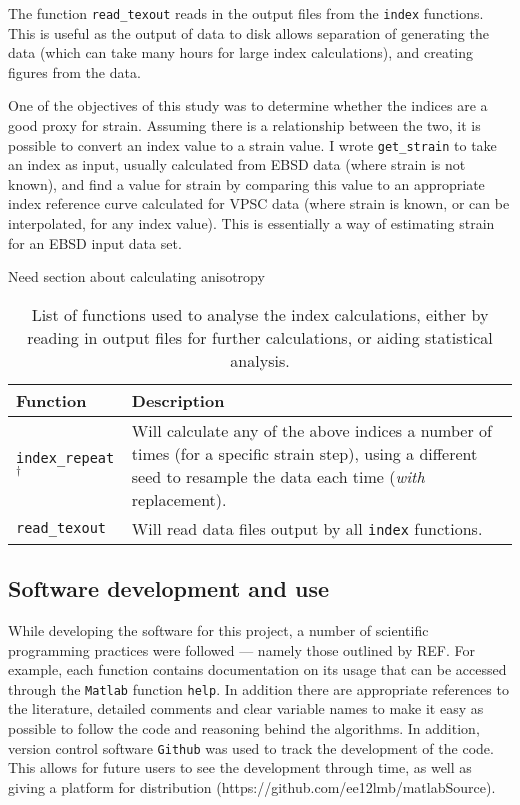 \documentclass[a4paper,12pt]{report}
\numberwithin{equation}{chapter}
\begin{document}
The function \texttt{read\_{}texout} reads in the output files from the \texttt{index} functions. This is useful as the output of data to disk allows separation of generating the data (which can take many hours for large index calculations), and creating figures from the data.

One of the objectives of this study was to determine whether the indices are a good proxy for strain. Assuming there is a relationship between the two, it is possible to convert an index value to a strain value. I wrote \texttt{get\_{}strain} to take an index as input, usually calculated from EBSD data (where strain is not known), and find a value for strain by comparing this value to an appropriate index reference curve calculated for VPSC data (where strain is known, or can be interpolated, for any index value). This is essentially a way of estimating strain for an EBSD input data set.

Need section about calculating anisotropy

\begin{table}[h!] 
	\centering
	\caption[Functions: analysis]{List of functions used to analyse the index calculations, either by reading in output files for further calculations, or aiding statistical analysis.}
	\noindent
	
\begin{tabularx}{\textwidth}{lX}

\hline
\hline
Function    & Description   \\ 
\hline
\hline
\texttt{index\_{}repeat}$^{\dagger}$ & Will calculate any of the above indices a number of times (for a specific strain step), using a different seed to resample the data each time (\emph{with} replacement). \\

\texttt{read\_{}texout} & Will read data files output by all \texttt{index} functions. \\
\hline

\end{tabularx}
\label{tab:analysis_functions}
\end{table}

\subsection{Software development and use}

While developing the software for this project, a number of scientific programming practices were followed --- namely those outlined by REF. For example, each function contains documentation on its usage that can be accessed through the \texttt{Matlab} function \texttt{help}. In addition there are appropriate references to the literature, detailed comments and clear variable names to make it easy as possible to follow the code and reasoning behind the algorithms. In addition, version control software \texttt{Github} was used to track the development of the code. This allows for future users to see the development through time, as well as giving a platform for distribution (https://github.com/ee12lmb/matlabSource).
\end{document}
